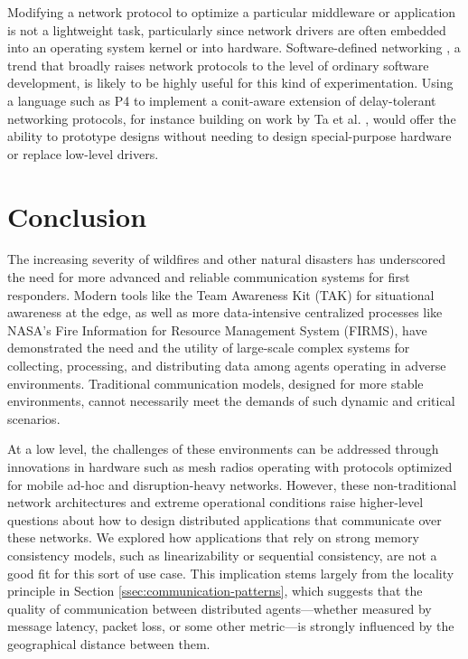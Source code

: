\documentclass[]             %
{NASA}                       %
\theoremstyle{definition}
\begin{document}
Modifying a network protocol to optimize a particular middleware or
application is not a lightweight task, particularly since network
drivers are often embedded into an operating system kernel or into
hardware. Software-defined networking \cite{2016:sdn-battlefield}, a
trend that broadly raises network protocols to the level of ordinary
software development, is likely to be highly useful for this kind of
experimentation. Using a language such as P4 \cite{2014:p4} to
implement a conit-aware extension of delay-tolerant networking
protocols, for instance building on work by Ta et
al. \cite{2023:towards-sdn-dtn}, would offer the ability to prototype
designs without needing to design special-purpose hardware or replace
low-level drivers.

\section{Conclusion}
\label{sec:conclusion}
The increasing severity of wildfires and other natural disasters has
underscored the need for more advanced and reliable communication
systems for first responders. Modern tools like the Team Awareness Kit
(TAK) for situational awareness at the edge, as well as more
data-intensive centralized processes like NASA's Fire Information for
Resource Management System (FIRMS), have demonstrated the need and the
utility of large-scale complex systems for collecting, processing, and
distributing data among agents operating in adverse environments.
Traditional communication models, designed for more stable
environments, cannot necessarily meet the demands of such dynamic and
critical scenarios.

At a low level, the challenges of these environments can be addressed
through innovations in hardware such as mesh radios operating with
protocols optimized for mobile ad-hoc and disruption-heavy
networks. However, these non-traditional network architectures and
extreme operational conditions raise higher-level questions about how
to design distributed applications that communicate over these
networks. We explored how applications that rely on strong memory
consistency models, such as linearizability or sequential consistency,
are not a good fit for this sort of use case. This implication
stems largely from the locality principle in Section
\ref{ssec:communication-patterns}, which suggests that the quality of
communication between distributed agents---whether measured by message
latency, packet loss, or some other metric---is strongly influenced by
the geographical distance between them.
\end{document}

